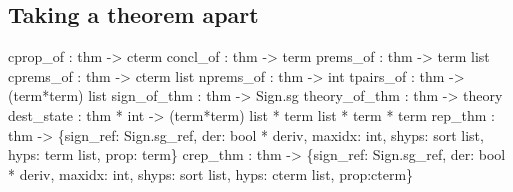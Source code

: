 \subsection{Taking a theorem apart}
\begin{ttbox} 
cprop_of      : thm -> cterm
concl_of      : thm -> term
prems_of      : thm -> term list
cprems_of     : thm -> cterm list
nprems_of     : thm -> int
tpairs_of     : thm -> (term*term) list
sign_of_thm   : thm -> Sign.sg
theory_of_thm : thm -> theory
dest_state : thm * int -> (term*term) list * term list * term * term
rep_thm    : thm -> \{sign_ref: Sign.sg_ref, der: bool * deriv, maxidx: int,
                     shyps: sort list, hyps: term list, prop: term\}
crep_thm   : thm -> \{sign_ref: Sign.sg_ref, der: bool * deriv, maxidx: int,
                     shyps: sort list, hyps: cterm list, prop:{\ts}cterm\}
\end{ttbox}
